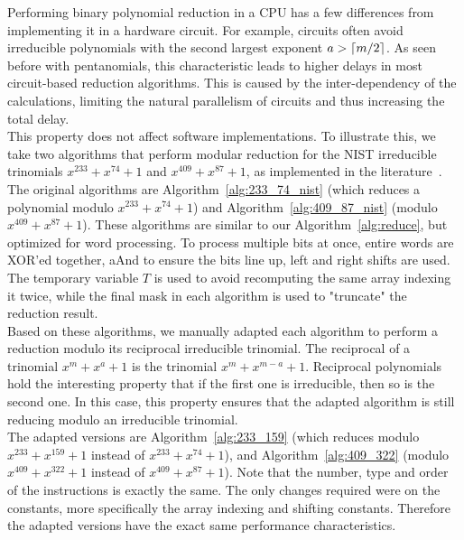 Performing binary polynomial reduction in a CPU has a few differences from implementing it in a hardware circuit. For example, circuits often avoid irreducible polynomials with the second largest exponent $a > \lceil m/2\rceil$. As seen before with pentanomials, this characteristic leads to higher delays in most circuit-based reduction algorithms. This is caused by the inter-dependency of the calculations, limiting the natural parallelism of circuits and thus increasing the total delay. \\

This property does not affect software implementations. To illustrate this, we take two algorithms that perform modular reduction for the NIST irreducible trinomials $x^{233} + x^{74} + 1$ and $x^{409} + x^{87} + 1$, as implemented in the literature~\cite[p. 55]{hankerson2006guide}. \\

The original algorithms are Algorithm~\ref{alg:233_74_nist} (which reduces a polynomial modulo $x^{233} + x^{74} + 1$) and Algorithm~\ref{alg:409_87_nist} (modulo $x^{409} + x^{87} + 1$). These algorithms are similar to our Algorithm~\ref{alg:reduce}, but optimized for word processing. To process multiple bits at once, entire words are XOR'ed together, aAnd to ensure the bits line up, left and right shifts are used. The temporary variable $T$ is used to avoid recomputing the same array indexing it twice, while the final mask in each algorithm is used to "truncate" the reduction result. \\

Based on these algorithms, we manually adapted each algorithm to perform a reduction modulo its reciprocal irreducible trinomial. The reciprocal of a trinomial $x^m + x^a +1$ is the trinomial $x^m + x^{m-a} + 1$. Reciprocal polynomials hold the interesting property that if the first one is irreducible, then so is the second one. In this case, this property ensures that the adapted algorithm is still reducing modulo an irreducible trinomial. \\

The adapted versions are Algorithm~\ref{alg:233_159} (which reduces modulo $x^{233} + x^{159} + 1$ instead of $x^{233} + x^{74} + 1$), and Algorithm~\ref{alg:409_322} (modulo $x^{409} + x^{322} + 1$ instead of $x^{409} + x^{87} + 1$). Note that the number, type and order of the instructions is exactly the same. The only changes required were on the constants, more specifically the array indexing and shifting constants. Therefore the adapted versions have the exact same performance characteristics. \\

